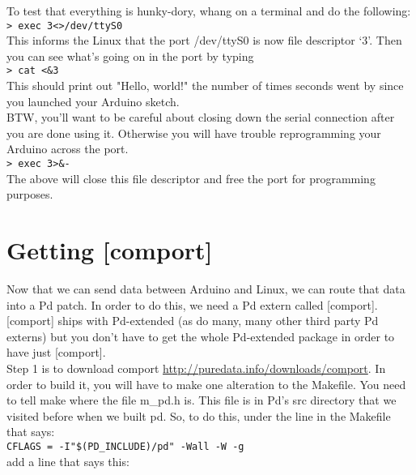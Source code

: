\documentclass{article}
\begin{document}
To test that everything is hunky-dory, whang on a terminal and do the following:\\

\texttt{\textgreater{} exec 3\textless{}\textgreater{}/dev/ttyS0}\\

This informs the Linux that the port /dev/ttyS0 is now file descriptor `3'. Then you can see what's going on in the port by typing\\

\texttt{\textgreater{} cat \textless{}\&3}\\

This should print out "Hello, world!" the number of times seconds went by since you launched your Arduino sketch.\\

BTW, you'll want to be careful about closing down the serial connection after you are done using it. Otherwise you will have trouble reprogramming your Arduino across the port.\\

\texttt{\textgreater{} exec 3\textgreater{}\&-}\\

The above will close this file descriptor and free the port for programming purposes.\\

\section{Getting [comport]}
Now that we can send data between Arduino and Linux, we can route that data into a Pd patch. In order to do this, we need a Pd extern called [comport]. [comport] ships with Pd-extended (as do many, many other third party Pd externs) but you don't have to get the whole Pd-extended package in order to have just [comport].\\

Step 1 is to download comport \url{http://puredata.info/downloads/comport}. In order to build it, you will have to make one alteration to the Makefile. You need to tell make where the file m\_pd.h is. This file is in Pd's src directory that we visited before when we built pd. So, to do this, under the line in the Makefile that says:\\

\texttt{CFLAGS = -I"\$(PD\_INCLUDE)/pd" -Wall -W -g}\\

add a line that says this:\\
\end{document}

